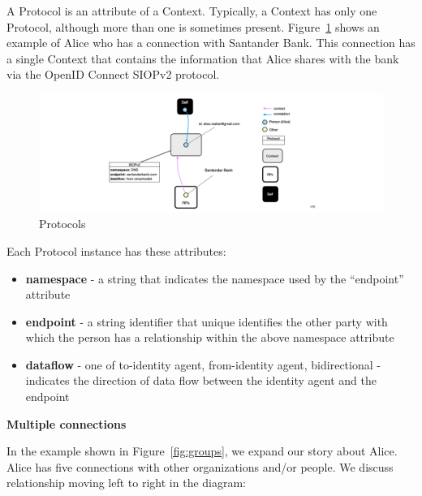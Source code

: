\documentclass[11pt, oneside]{article}   	%
\begin{document}
A Protocol is an attribute of a Context. Typically, a Context has only one Protocol, although more than one is sometimes present. Figure~\ref{fig:protocol} shows an example of Alice who has a connection with Santander Bank. This connection has a single Context that contains the information that Alice shares with the bank via the OpenID Connect SIOPv2 protocol.

\begin{figure}[htbp]
	\includegraphics[width=\textwidth]{./images/context-with-protocol.png}
	\caption{Protocols}
	\label{fig:protocol}
\end{figure}

Each Protocol instance has these attributes:
\begin{itemize}
\item \textbf{namespace} - a string that indicates the namespace used by the ``endpoint'' attribute
\item \textbf{endpoint} - a string identifier that unique identifies the other party with which the person has a relationship within the above namespace attribute
\item \textbf{dataflow} - one of {to-identity agent, from-identity agent, bidirectional} - indicates the direction of data flow between the identity agent and the endpoint
\end{itemize}

\textbf{Multiple connections}

In the example shown in Figure~\ref{fig:groups}, we expand our story about Alice. Alice has five connections with other organizations and/or people. We discuss relationship moving left to right in the diagram:
\end{document}
